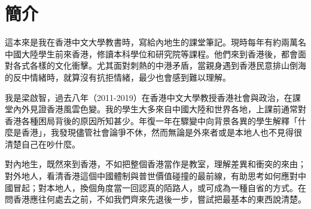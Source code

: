 \section*{簡介}
這本來是我在香港中文大學教書時，寫給內地生的課堂筆記。現時每年有約兩萬名中國大陸學生前來香港，修讀本科學位和研究院等課程。他們來到香港後，都會面對各式各樣的文化衝擊。尤其面對刺熱的中港矛盾，當親身遇到香港民意排山倒海的反中情緒時，就算沒有抗拒情緒，最少也會感到難以理解。

我是梁啟智，過去八年（2011-2019）在香港中文大學教授香港社會與政治，在課堂內外見證香港風雲色變。我的學生大多來自中國大陸和世界各地，上課前通常對香港各種困局背後的原因所知甚少。年復一年在驟變中向背景各異的學生解釋「什麼是香港」，我發現儘管社會論爭不休，然而無論是外來者或是本地人也不見得很清楚自己在吵什麼。

對內地生，既然來到香港，不如把整個香港當作是教室，理解差異和衝突的來由；對外地人，看清香港這個中國體制與普世價值碰撞的最前線，有助思考如何應對中國冒起；對本地人，換個角度當一回認真的陌路人，或可成為一種自省的方式。在問香港應往何處去之前，不如我們齊來先退後一步，嘗試把最基本的東西說清楚。